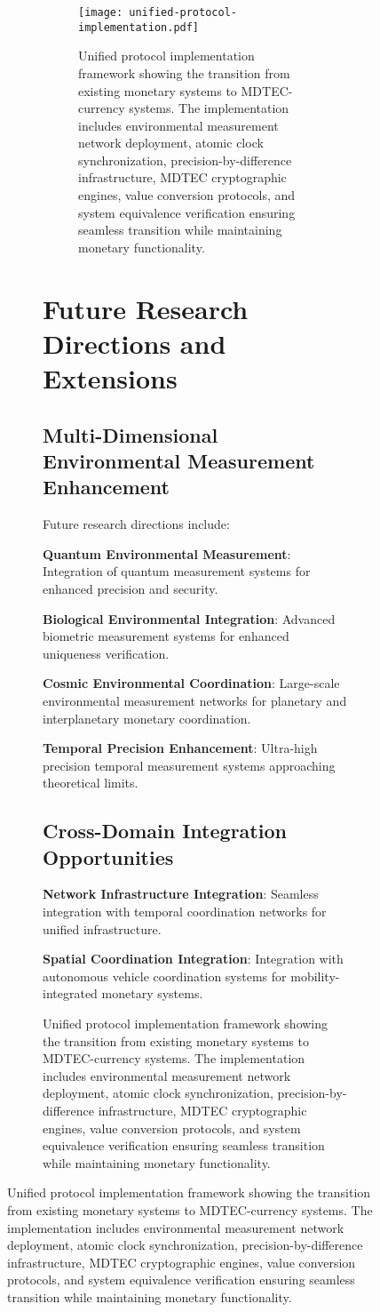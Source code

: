 \documentclass[12pt,a4paper]{article}
\begin{document}
\begin{figure}[H]
\begin{figure}[H]
\begin{figure}[H]
\centering
\texttt{[image: unified-protocol-implementation.pdf]}
\caption{Unified protocol implementation framework showing the transition from existing monetary systems to MDTEC-currency systems. The implementation includes environmental measurement network deployment, atomic clock synchronization, precision-by-difference infrastructure, MDTEC cryptographic engines, value conversion protocols, and system equivalence verification ensuring seamless transition while maintaining monetary functionality.}
\label{fig:unified_protocol_implementation}
\end{figure}

\section{Future Research Directions and Extensions}

\subsection{Multi-Dimensional Environmental Measurement Enhancement}

Future research directions include:

\textbf{Quantum Environmental Measurement}: Integration of quantum measurement systems for enhanced precision and security.

\textbf{Biological Environmental Integration}: Advanced biometric measurement systems for enhanced uniqueness verification.

\textbf{Cosmic Environmental Coordination}: Large-scale environmental measurement networks for planetary and interplanetary monetary coordination.

\textbf{Temporal Precision Enhancement}: Ultra-high precision temporal measurement systems approaching theoretical limits.

\subsection{Cross-Domain Integration Opportunities}

\textbf{Network Infrastructure Integration}: Seamless integration with temporal coordination networks for unified infrastructure.

\textbf{Spatial Coordination Integration}: Integration with autonomous vehicle coordination systems for mobility-integrated monetary systems.


\end{figure}
\end{figure}
\end{document}
